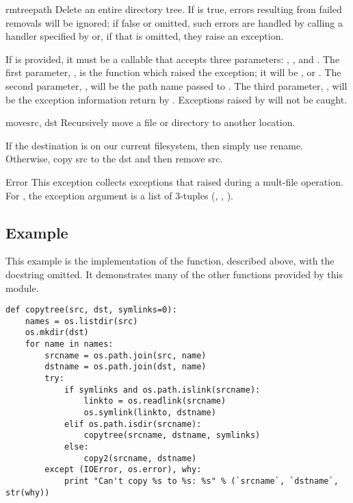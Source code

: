 \begin{funcdesc}{rmtree}{path}
  Delete an entire directory tree.
  If  is true,
  errors resulting from failed removals will be ignored; if false or
  omitted, such errors are handled by calling a handler specified by
   or, if that is omitted, they raise an exception.

  If  is provided, it must be a callable that accepts
  three parameters: , , and .
  The first parameter, , is the function which raised
  the exception; it will be ,  or
  .  The second parameter, , will be
  the path name passed to .  The third parameter,
  , will be the exception information return by
  .  Exceptions raised by  will
  not be caught.
\end{funcdesc}

\begin{funcdesc}{move}{src, dst}
Recursively move a file or directory to another location.

If the destination is on our current filesystem, then simply use
rename.  Otherwise, copy src to the dst and then remove src.

\end{funcdesc}

\begin{excdesc}{Error}
This exception collects exceptions that raised during a mult-file
operation. For , the exception argument is a
list of 3-tuples (, , ).

\end{excdesc}

\subsection{Example \label{shutil-example}}

This example is the implementation of the 
function, described above, with the docstring omitted.  It
demonstrates many of the other functions provided by this module.

\begin{verbatim}
def copytree(src, dst, symlinks=0):
    names = os.listdir(src)
    os.mkdir(dst)
    for name in names:
        srcname = os.path.join(src, name)
        dstname = os.path.join(dst, name)
        try:
            if symlinks and os.path.islink(srcname):
                linkto = os.readlink(srcname)
                os.symlink(linkto, dstname)
            elif os.path.isdir(srcname):
                copytree(srcname, dstname, symlinks)
            else:
                copy2(srcname, dstname)
        except (IOError, os.error), why:
            print "Can't copy %s to %s: %s" % (`srcname`, `dstname`, str(why))
\end{verbatim}
